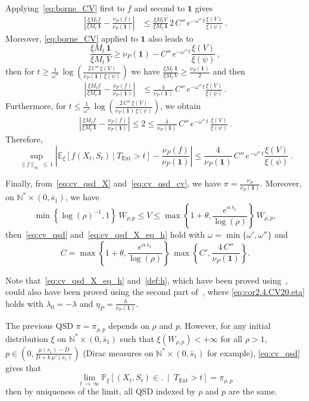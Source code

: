 \documentclass[10pt]{amsart}
\theoremstyle{definition}\newtheorem{defi}[theo]{Definition}\newtheorem{rema}[theo]{Remark}\newtheorem{exam}[theo]{Example}\newtheorem{exem}[theo]{Example}\newtheorem{nota}[theo]{Notation}
\newcommand{\PP}{\mathbb{P}}
\newcommand{\NN}{\mathbb{N}}
\newcommand{\EE}{\mathbb{E}}
\newcommand{\X}{\NN^* \times (0,\bar s_1)}
\newcommand{\Text}{T_{\mathrm{Ext}}}
\newcommand{\1}{\mathbf{1}}
\begin{document}
Applying~\eqref{eq:borne_CV} first to $f$ and second to $\1$ gives
\begin{align*}
\left| \frac{\xi M_t f}{\xi M_t\,\1} - \frac{\nu_P(f)}{\nu_P(\1)}\right| &\leq
\frac{\xi M_t V}{\xi M_t\,\1}\, 2\,C''\,e^{-\omega''\,t} \frac{\xi(V)}{\xi(\psi)}\,.
\end{align*}
Moreover, \eqref{eq:borne_CV} applied to $\1$ also leads to
\[
\frac{\xi M_t\,\1}{\xi M_t\,V} \geq \nu_P(\1) - C''\,e^{-\omega''\,t} \frac{\xi(V)}{\xi(\psi)}\,,
\]
then for $t\geq \frac{1}{\omega''}\,\log(\frac{2\,C''\,\xi(V)}{\nu_P(\1)\,\xi(\psi)})$ we have $\frac{\xi M_t\,\1}{\xi M_t\,V} \geq \frac{\nu_P(\1)}{2}$ and then
\begin{align*}
\left| \frac{\xi M_t f}{\xi M_t\,\1} - \frac{\nu_P(f)}{\nu_P(\1)}\right| &\leq
\frac{4}{\nu_P(\1)}\, C''\,e^{-\omega''\,t} \frac{\xi(V)}{\xi(\psi)}\,.
\end{align*}
Furthermore, for $t\leq \frac{1}{\omega''}\,\log(\frac{2\,C''\,\xi(V)}{\nu_P(\1)\,\xi(\psi)})$, we obtain
\begin{align*}
\left| \frac{\xi M_t f}{\xi M_t\,\1} - \frac{\nu_P(f)}{\nu_P(\1)}\right| \leq 2\leq \frac{4}{\nu_P(\1)}\,C''\,e^{-\omega''\,t}\,\frac{\xi(V)}{\xi(\psi)}\,.
\end{align*}
Therefore,
\begin{equation}\label{eq:cv_qsd_cv}
\sup_{\|f \|_\infty\,\leq\,1} \left|\EE_\xi \left[f(X_t,S_t) \ | \ \Text>t\right] - \frac{\nu_P(f)}{\nu_P(\1)} \right| \leq \frac{4}{\nu_P(\1)}\, C''\,e^{-\omega''\,t} \frac{\xi(V)}{\xi(\psi)}\,.
\end{equation}



Finally, from~\eqref{eq:cv_qsd_X} and~\eqref{eq:cv_qsd_cv}, we have $\pi = \frac{\nu_P}{\nu_P(\1)}$. Moreover, on $\X$, we have
\[
\min\left\{\log(\rho)^{-1},1\right\}\,W_{\rho,p} \leq V\leq \max\left\{1+\theta,\frac{e^{\alpha\,\bar s_1}}{\log{(\rho)}}\right\}\, W_{\rho,p},
\]
then~\eqref{eq:cv_qsd} and~\eqref{eq:cv_qsd_X_eq_h} hold with $\omega=\min\{\omega',\omega''\}$ and 
\[
C=\max\left\{1+\theta,\frac{e^{\alpha\,\bar s_1}}{\log(\rho)}\right\}\,\max\left\{C',\frac{4\,C''}{\nu_P(\1)}\right\}.
\]

Note that~\eqref{eq:cv_qsd_X_eq_h} and~\eqref{def:h}, which have been proved using~\cite[Theorem~5.1]{BCGM}, could also have been proved using the second part of~\cite[Corollary~2.4]{CV20}, where \eqref{eq:cor2.4.CV20.eta} holds with $\lambda_0=-\lambda$ and $\eta_P= \frac{h}{\nu_P(\1)}$.


The previous QSD $\pi=\pi_{\rho,p}$ depends on $\rho$ and $p$. However, for any initial distribution $\xi$ on $\NN^*\times (0, \bar s_1)$ such that $\xi(W_{\rho,p})<+\infty$ for all $\rho>1$, $p\in(0,\frac{\mu(\bar s_1)-D}{D+k\,\mu'(\bar s_1)})$ (Dirac measures on $\NN^*\times (0, \bar s_1)$ for example), \eqref{eq:cv_qsd} gives that
\[
\lim_{t\,\to\,\infty}\PP_\xi \left[(X_t,S_t)\in. \ \middle| \ \Text>t\right] = \pi_{\rho,p}
\]
then by uniqueness of the limit, all QSD indexed by $\rho$ and $p$ are the same.
\end{document}
